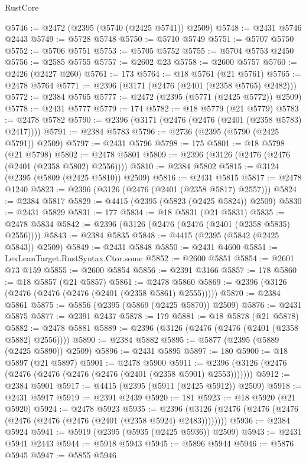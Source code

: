 \begin{lexlean}{RustCore}
\begin{coremodule}
@5746 := @2472 (@2395 (@5740 (@2425 @5741)) @2509)
@5748 := @2431 @5746 @2443
@5749 := @5728 @5748
@5750 := @5710 @5749
@5751 := @5707 @5750
@5752 := @5706 @5751
@5753 := @5705 @5752
@5755 := @5704 @5753 @2450
@5756 := @2585 @5755
@5757 := @2602 @23
@5758 := @2600 @5757
@5760 := @2426 (@2427 @260)
@5761 := 173
@5764 := @18 @5761 (@21 @5761)
@5765 := @2478 @5764
@5771 := @2396 (@3171 (@2476 (@2401 (@2358 @5765) @2482)))
@5772 := @2384 @5765
@5777 := @2472 (@2395 (@5771 (@2425 @5772)) @2509)
@5778 := @2431 @5777
@5779 := 174
@5782 := @18 @5779 (@21 @5779)
@5783 := @2478 @5782
@5790 := @2396 (@3171 (@2476 (@2476 (@2401 (@2358 @5783) @2417))))
@5791 := @2384 @5783
@5796 := @2736 (@2395 (@5790 (@2425 @5791)) @2509)
@5797 := @2431 @5796
@5798 := 175
@5801 := @18 @5798 (@21 @5798)
@5802 := @2478 @5801
@5809 := @2396 (@3126 (@2476 (@2476 (@2401 (@2358 @5802) @2556))))
@5810 := @2384 @5802
@5815 := @3124 (@2395 (@5809 (@2425 @5810)) @2509)
@5816 := @2431 @5815
@5817 := @2478 @1240
@5823 := @2396 (@3126 (@2476 (@2401 (@2358 @5817) @2557)))
@5824 := @2384 @5817
@5829 := @4415 (@2395 (@5823 (@2425 @5824)) @2509)
@5830 := @2431 @5829
@5831 := 177
@5834 := @18 @5831 (@21 @5831)
@5835 := @2478 @5834
@5842 := @2396 (@3126 (@2476 (@2476 (@2401 (@2358 @5835) @2556))))
@5843 := @2384 @5835
@5848 := @4415 (@2395 (@5842 (@2425 @5843)) @2509)
@5849 := @2431 @5848
@5850 := @2431 @4600
@5851 := LexLeanTarget.RustSyntax.Ctor.some
@5852 := @2600 @5851
@5854 := @2601 @73 @159
@5855 := @2600 @5854
@5856 := @2391 @3166
@5857 := 178
@5860 := @18 @5857 (@21 @5857)
@5861 := @2478 @5860
@5869 := @2396 (@3126 (@2476 (@2476 (@2476 (@2401 (@2358 @5861) @2555)))))
@5870 := @2384 @5861
@5875 := @5856 (@2395 (@5869 (@2425 @5870)) @2509)
@5876 := @2431 @5875
@5877 := @2391 @2437
@5878 := 179
@5881 := @18 @5878 (@21 @5878)
@5882 := @2478 @5881
@5889 := @2396 (@3126 (@2476 (@2476 (@2401 (@2358 @5882) @2556))))
@5890 := @2384 @5882
@5895 := @5877 (@2395 (@5889 (@2425 @5890)) @2509)
@5896 := @2431 @5895
@5897 := 180
@5900 := @18 @5897 (@21 @5897)
@5901 := @2478 @5900
@5911 := @2396 (@3126 (@2476 (@2476 (@2476 (@2476 (@2476 (@2401 (@2358 @5901) @2553)))))))
@5912 := @2384 @5901
@5917 := @4415 (@2395 (@5911 (@2425 @5912)) @2509)
@5918 := @2431 @5917
@5919 := @2391 @2439
@5920 := 181
@5923 := @18 @5920 (@21 @5920)
@5924 := @2478 @5923
@5935 := @2396 (@3126 (@2476 (@2476 (@2476 (@2476 (@2476 (@2476 (@2401 (@2358 @5924) @2483))))))))
@5936 := @2384 @5924
@5941 := @5919 (@2395 (@5935 (@2425 @5936)) @2509)
@5943 := @2431 @5941 @2443
@5944 := @5918 @5943
@5945 := @5896 @5944
@5946 := @5876 @5945
@5947 := @5855 @5946

\end{coremodule}
\end{lexlean}
